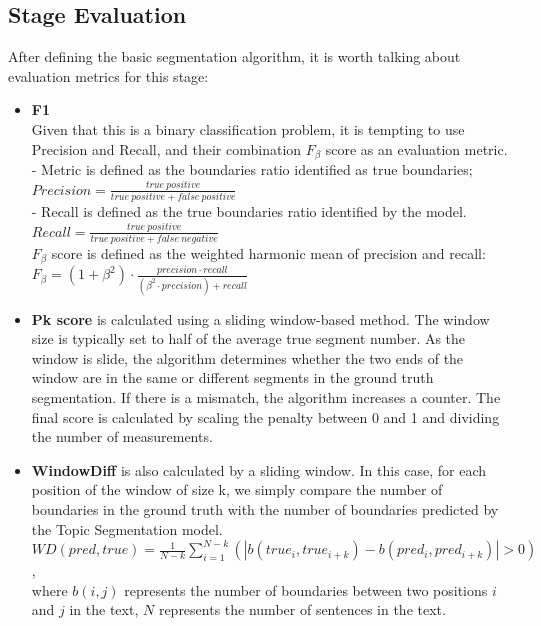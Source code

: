 \documentclass[PMI,VKR]{HSEUniversity}
\begin{document}
\subsection{Stage Evaluation}

After defining the basic segmentation algorithm, it is worth talking about evaluation metrics for this stage:
\begin{itemize}
    \item \textbf{F1}\\
    Given that this is a binary classification problem, it is tempting to use Precision and Recall, and their combination $F_{\beta}$ score as an evaluation metric. \\ 
     - Metric is defined as the boundaries ratio identified as true boundaries; \\
       $Precision = \frac{true \: positive}{true \: positive + false \: positive}$ \\
     - Recall is defined as the true boundaries ratio identified by the model. \\
       $Recall = \frac{true \: positive}{true \: positive + false \: negative}$ \\
    $F_{\beta}$ score is defined as the weighted harmonic mean of precision and recall: \\
    $F_{\beta} = (1 + \beta^{2}) \cdot \frac{precision \cdot recall}{(\beta^{2} \cdot precision) + recall}$
    \item \textbf{Pk score} is calculated using a sliding window-based method. The window size is typically set to half of the average true segment number. As the window is slide, the algorithm determines whether the two ends of the window are in the same or different segments in the ground truth segmentation. If there is a mismatch, the algorithm increases a counter. The final score is calculated by scaling the penalty between 0 and 1 and dividing the number of measurements.
    \item \textbf{WindowDiff} is also calculated by a sliding window. In this case, for each position of the window of size k, we simply compare the number of boundaries in the ground truth with the number of boundaries predicted by the Topic Segmentation model.\\
    $WD(pred, true) = \frac{1}{N - k}\sum_{i = 1}^{N - k}(\left\lvert b (true_{i}, true_{i + k}) - b(pred_{i}, pred_{i + k}) \right\rvert > 0)$, \\ 
    where $b(i, j)$ represents the number of boundaries between two positions $i$ and $j$ in the text, $N$ represents the number of sentences in the text.
\end{itemize} 
\end{document}
